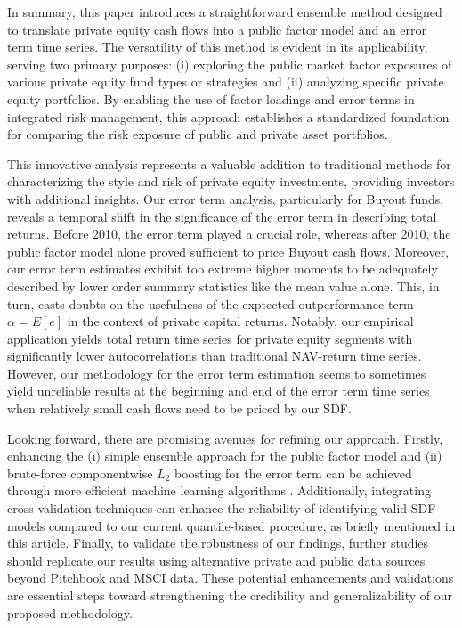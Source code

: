 \documentclass[12pt]{article}
\begin{document}
In summary, this paper introduces a straightforward ensemble method designed to translate private equity cash flows into a public factor model and an error term time series. 
The versatility of this method is evident in its applicability, serving two primary purposes: 
(i) exploring the public market factor exposures of various private equity fund types or strategies and (ii) analyzing specific private equity portfolios. 
By enabling the use of factor loadings and error terms in integrated risk management, this approach establishes a standardized foundation for comparing the risk exposure of public and private asset portfolios.

This innovative analysis represents a valuable addition to traditional methods for characterizing the style and risk of private equity investments, providing investors with additional insights. 
Our error term analysis, particularly for Buyout funds, reveals a temporal shift in the significance of the error term in describing total returns. 
Before 2010, the error term played a crucial role, whereas after 2010, the public factor model alone proved sufficient to price Buyout cash flows. 
Moreover, our error term estimates exhibit too extreme higher moments to be adequately  described by lower order summary statistics like the mean value alone.
This, in turn, casts doubts on the usefulness of the exptected outperformance term $\alpha = E [ e ]$ in the context of private capital returns.
Notably, our empirical application yields total return time series for private equity segments with significantly lower autocorrelations than traditional NAV-return time series.
However, our methodology for the error term estimation seems to sometimes yield unreliable results at the beginning and end of the error term time series when relatively small cash flows need to be priced by our SDF.

Looking forward, there are promising avenues for refining our approach. 
Firstly, enhancing the (i) simple ensemble approach for the public factor model and (ii) brute-force componentwise $L_2$ boosting for the error term can be achieved through more efficient machine learning algorithms \citep{B12}.
Additionally, integrating cross-validation techniques can enhance the reliability of identifying valid SDF models compared to our current quantile-based procedure, as briefly mentioned in this article.
Finally, to validate the robustness of our findings, further studies should replicate our results using alternative private and public data sources beyond Pitchbook and MSCI data. 
These potential enhancements and validations are essential steps toward strengthening the credibility and generalizability of our proposed methodology.




\appendix


% 
% 
% 
\end{document}
